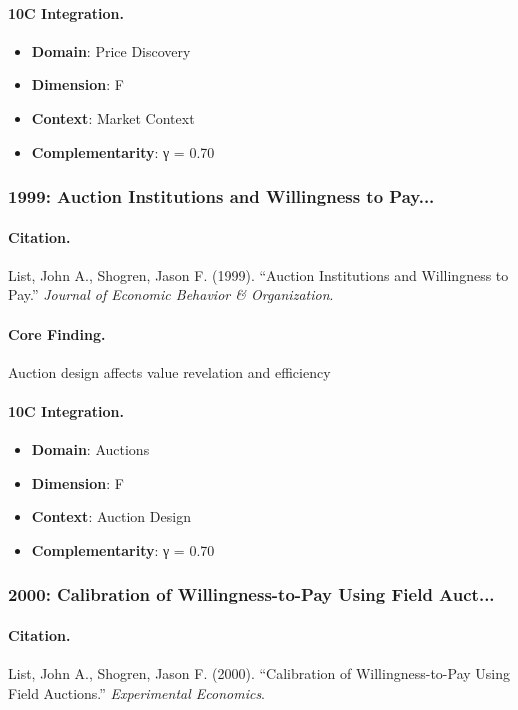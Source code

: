 \paragraph{10C Integration.}
\begin{itemize}[nosep]
  \item \textbf{Domain}: Price Discovery
  \item \textbf{Dimension}: F
  \item \textbf{Context}: Market Context
  \item \textbf{Complementarity}: γ = 0.70
\end{itemize}


\subsubsection{1999: Auction Institutions and Willingness to Pay...}

\paragraph{Citation.}
List, John A., Shogren, Jason F. (1999). ``Auction Institutions and Willingness to Pay.''
\textit{Journal of Economic Behavior & Organization}.

\paragraph{Core Finding.}
Auction design affects value revelation and efficiency

\paragraph{10C Integration.}
\begin{itemize}[nosep]
  \item \textbf{Domain}: Auctions
  \item \textbf{Dimension}: F
  \item \textbf{Context}: Auction Design
  \item \textbf{Complementarity}: γ = 0.70
\end{itemize}


\subsubsection{2000: Calibration of Willingness-to-Pay Using Field Auct...}

\paragraph{Citation.}
List, John A., Shogren, Jason F. (2000). ``Calibration of Willingness-to-Pay Using Field Auctions.''
\textit{Experimental Economics}.

